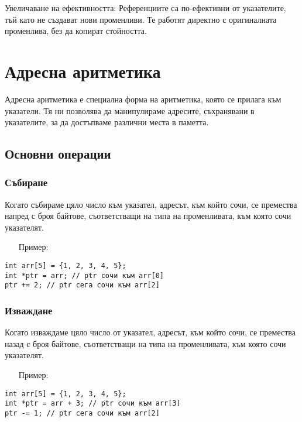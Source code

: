 \documentclass[oneside]{book}
\begin{document}
Увеличаване на ефективността: Референциите са по-ефективни от указателите, тъй като не създават нови променливи. Те работят директно с оригиналната променлива, без да копират стойността.

\section{Адресна аритметика}
Адресна аритметика е специална форма на аритметика, която се прилага към указатели. Тя ни позволява да манипулираме адресите, съхранявани в указателите, за да достъпваме различни места в паметта.

\subsection{Основни операции}
\subsubsection{Събиране}
Когато събираме цяло число към указател, адресът, към който сочи, се премества напред с броя байтове, съответстващи на типа на променливата, към която сочи указателят.
\pagebreak
\begin{itemize}\item[Пример:]\end{itemize}
\begin{mdframed}\begin{lstlisting}
int arr[5] = {1, 2, 3, 4, 5};
int *ptr = arr; // ptr сочи към arr[0]
ptr += 2; // ptr сега сочи към arr[2]
\end{lstlisting}\end{mdframed}

\subsubsection{Изваждане}
Когато изваждаме цяло число от указател, адресът, към който сочи, се премества назад с броя байтове, съответстващи на типа на променливата, към която сочи указателят.

\begin{itemize}\item[Пример:]\end{itemize}
\begin{mdframed}\begin{lstlisting}
int arr[5] = {1, 2, 3, 4, 5};
int *ptr = arr + 3; // ptr сочи към arr[3]
ptr -= 1; // ptr сега сочи към arr[2]
\end{lstlisting}\end{mdframed}
\end{document}

